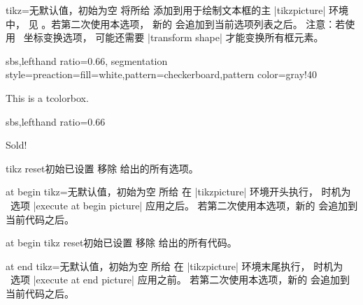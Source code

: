 \begin{docTcbKey}{tikz}{=}{无默认值，初始为空}
  将所给  添加到用于绘制文本框的主 |tikzpicture| 环境中，
  见 \cite{tantau:tikz_and_pgf}。若第二次使用本选项，
  新的  会追加到当前选项列表之后。
  注意：若使用 \tikzname\ 坐标变换选项，
  可能还需要 |transform shape| 才能变换所有框元素。
\begin{dispExample*}{sbs,lefthand ratio=0.66,
  segmentation style={preaction={fill=white},pattern=checkerboard,pattern color=gray!40}}

\begin{tcolorbox}[title=Transparent box,
  tikz={opacity=0.5,transparency group}]
This is a tcolorbox.
\end{tcolorbox}
\end{dispExample*}

\begin{dispExample*}{sbs,lefthand ratio=0.66}

\begin{tcolorbox}[title=Rotated box,
  tikz={rotate=30}]
Sold!
\end{tcolorbox}
\end{dispExample*}

\end{docTcbKey}


\begin{docTcbKey}{tikz reset}{}{初始已设置}
  移除  给出的所有选项。
\end{docTcbKey}


\begin{docTcbKey}{at begin tikz}{=}{无默认值，初始为空}
  所给  在 |tikzpicture| 环境开头执行，
  时机为 \tikzname\ 选项 |execute at begin picture| 应用之后。
  若第二次使用本选项，新的  会追加到当前代码之后。
\end{docTcbKey}


\begin{docTcbKey}{at begin tikz reset}{}{初始已设置}
  移除  给出的所有代码。
\end{docTcbKey}


\begin{docTcbKey}{at end tikz}{=}{无默认值，初始为空}
  所给  在 |tikzpicture| 环境末尾执行，
  时机为 \tikzname\ 选项 |execute at end picture| 应用之前。
  若第二次使用本选项，新的  会追加到当前代码之后。
\end{docTcbKey}


